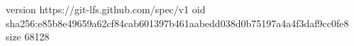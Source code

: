 version https://git-lfs.github.com/spec/v1
oid sha256:e85b8e49659a62cf84cab601397b461aabedd038d0b75197a4a4f3daf9cc0fe8
size 68128
